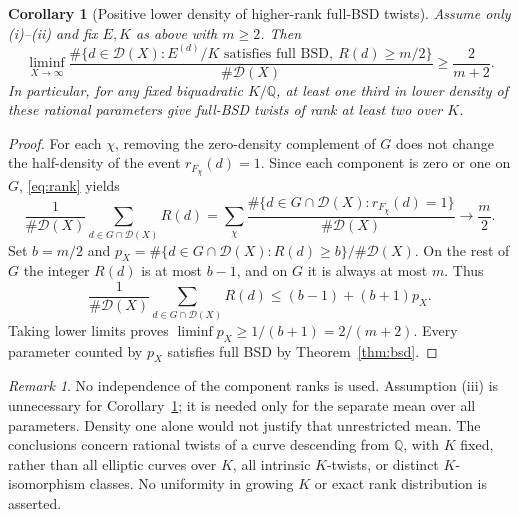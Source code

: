 \documentclass[11pt]{article}
\newtheorem{corollary}[theorem]{Corollary}
\theoremstyle{definition}
\theoremstyle{remark}
\newtheorem{remark}[theorem]{Remark}
\newcommand{\Q}{\mathbb Q}
\begin{document}
\begin{corollary}[Positive lower density of higher-rank full-BSD twists]\label{cor:highrank}
Assume only (i)--(ii) and fix $E,K$ as above with $m\ge2$. Then
\[
\liminf_{X\to\infty}\frac{\#\{d\in\mathcal D(X): E^{(d)}/K\text{ satisfies full BSD},\ R(d)\ge m/2\}}{\#\mathcal D(X)}\ge\frac{2}{m+2}.
\]
In particular, for any fixed biquadratic $K/\Q$, at least one third in lower density of these rational parameters give full-BSD twists of rank at least two over $K$.
\end{corollary}
\begin{proof}
For each $\chi$, removing the zero-density complement of $G$ does not change the half-density of the event $r_{F_\chi}(d)=1$. Since each component is zero or one on $G$, \eqref{eq:rank} yields
\[
\frac1{\#\mathcal D(X)}\sum_{d\in G\cap\mathcal D(X)}R(d)
=\sum_\chi\frac{\#\{d\in G\cap\mathcal D(X):r_{F_\chi}(d)=1\}}{\#\mathcal D(X)}\longrightarrow\frac m2.
\]
Set $b=m/2$ and $p_X=\#\{d\in G\cap\mathcal D(X):R(d)\ge b\}/\#\mathcal D(X)$. On the rest of $G$ the integer $R(d)$ is at most $b-1$, and on $G$ it is always at most $m$. Thus
\[
\frac1{\#\mathcal D(X)}\sum_{d\in G\cap\mathcal D(X)}R(d)
\le (b-1)+(b+1)p_X.
\]
Taking lower limits proves $\liminf p_X\ge1/(b+1)=2/(m+2)$. Every parameter counted by $p_X$ satisfies full BSD by Theorem~\ref{thm:bsd}.
\end{proof}

\begin{remark}
No independence of the component ranks is used. Assumption (iii) is unnecessary for Corollary~\ref{cor:highrank}; it is needed only for the separate mean over all parameters. Density one alone would not justify that unrestricted mean. The conclusions concern rational twists of a curve descending from $\Q$, with $K$ fixed, rather than all elliptic curves over $K$, all intrinsic $K$-twists, or distinct $K$-isomorphism classes. No uniformity in growing $K$ or exact rank distribution is asserted.
\end{remark}
\end{document}
